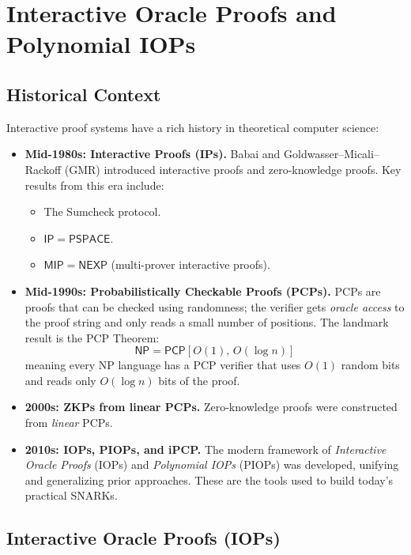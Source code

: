 \documentclass[11pt]{article}
\theoremstyle{plain}
\theoremstyle{definition}
\begin{document}
\section{Interactive Oracle Proofs and Polynomial IOPs}

\subsection{Historical Context}

Interactive proof systems have a rich history in theoretical computer science:

\begin{itemize}
  \item \textbf{Mid-1980s: Interactive Proofs (IPs).}
    Babai and Goldwasser--Micali--Rackoff (GMR) introduced interactive proofs
    and zero-knowledge proofs. Key results from this era include:
    \begin{itemize}
      \item The Sumcheck protocol.
      \item $\mathsf{IP} = \mathsf{PSPACE}$.
      \item $\mathsf{MIP} = \mathsf{NEXP}$ (multi-prover interactive proofs).
    \end{itemize}

  \item \textbf{Mid-1990s: Probabilistically Checkable Proofs (PCPs).}
    PCPs are proofs that can be checked using randomness; the verifier gets
    \emph{oracle access} to the proof string and only reads a small number of
    positions. The landmark result is the PCP Theorem:
    \[
      \mathsf{NP} = \mathsf{PCP}[O(1),\, O(\log n)]
    \]
    meaning every NP language has a PCP verifier that uses $O(1)$ random bits
    and reads only $O(\log n)$ bits of the proof.

  \item \textbf{2000s: ZKPs from linear PCPs.}
    Zero-knowledge proofs were constructed from \emph{linear} PCPs.

  \item \textbf{2010s: IOPs, PIOPs, and iPCP.}
    The modern framework of \emph{Interactive Oracle Proofs} (IOPs) and
    \emph{Polynomial IOPs} (PIOPs) was developed, unifying and generalizing
    prior approaches. These are the tools used to build today's practical SNARKs.
\end{itemize}

\subsection{Interactive Oracle Proofs (IOPs)}
\end{document}
